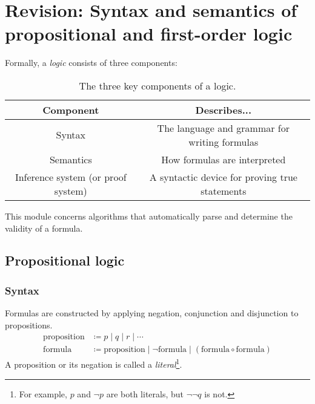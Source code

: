 \section{Revision: Syntax and semantics of propositional and first-order logic}

Formally, a \emph{logic} consists of three components:

\begin{table}[H]
    \centering
    \begin{tabular}{|c|c|}
        \hline
        \textbf{Component} & \textbf{Describes...}\\
        \hline
        Syntax & The language and grammar for writing formulas\\
        \hline
        Semantics & How formulas are interpreted\\
        \hline
        Inference system (or proof system) & A syntactic device for proving true statements\\
        \hline
    \end{tabular}

    \caption{The three key components of a logic.}
    \label{tab:Ch01-components-of-a-logic}
\end{table}

This module concerns algorithms that automatically parse and determine the validity of a formula.


\subsection{Propositional logic}

\subsubsection{Syntax}

Formulas are constructed by applying negation, conjunction and disjunction to propositions. 
%
\begin{align*}
    \text{proposition} &\coloneq p \;\vert\; q \;\vert\; r \;\vert\; \cdots\\
    \text{formula} &\coloneq \text{proposition} \;\vert\; \neg \text{formula} \;\vert\; (\text{formula} \circ \text{formula})  \tag{where \(\circ\) is \(\land\), \(\lor\) or \(\rightarrow\)}
\end{align*}
%
A proposition or its negation is called a \emph{literal}\footnote{For example, \(p\) and \(\neg p\) are both literals, but \(\neg\neg q\) is not.}.

